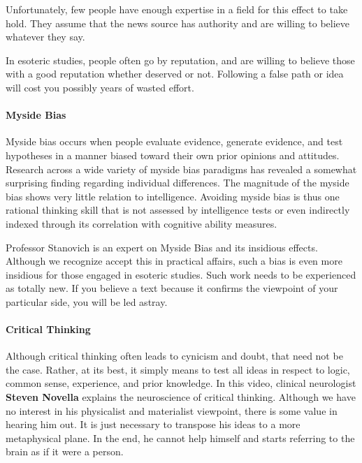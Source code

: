 Unfortunately, few people have enough expertise in a field for this effect to take hold. They assume that the news source has authority and are willing to believe whatever they say.

In esoteric studies, people often go by reputation, and are willing to believe those with a good reputation whether deserved or not. Following a false path or idea will cost you possibly years of wasted effort.

\paragraph{Myside Bias}
\begin{quotex}
Myside bias occurs when people evaluate evidence, generate evidence, and test hypotheses in a manner biased toward their own prior opinions and attitudes. Research across a wide variety of myside bias paradigms has revealed a somewhat surprising finding regarding individual differences. The magnitude of the myside bias shows very little relation to intelligence. Avoiding myside bias is thus one rational thinking skill that is not assessed by intelligence tests or even indirectly indexed through its correlation with cognitive ability measures. 

\end{quotex}
Professor Stanovich is an expert on Myside Bias and its insidious effects. Although we recognize accept this in practical affairs, such a bias is even more insidious for those engaged in esoteric studies. Such work needs to be experienced as totally new. If you believe a text because it confirms the viewpoint of your particular side, you will be led astray.

\paragraph{Critical Thinking}
Although critical thinking often leads to cynicism and doubt, that need not be the case. Rather, at its best, it simply means to test all ideas in respect to logic, common sense, experience, and prior knowledge. In this video, clinical neurologist \textbf{Steven Novella} explains the neuroscience of critical thinking. Although we have no interest in his physicalist and materialist viewpoint, there is some value in hearing him out. It is just necessary to transpose his ideas to a more metaphysical plane. In the end, he cannot help himself and starts referring to the brain as if it were a person.

